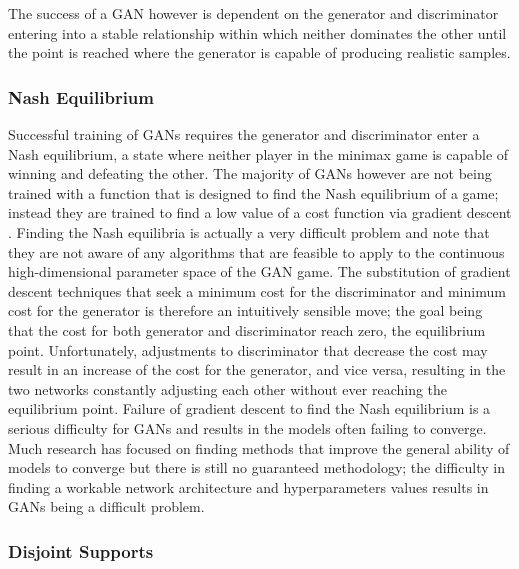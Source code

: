 \documentclass[a4paper, titlepage]{article}
\begin{document}
The success of a \ac{GAN} however is dependent on the generator and discriminator entering into a stable relationship within which neither dominates the other until the point is reached where the generator is capable of producing realistic samples.

\subsubsection{Nash Equilibrium}

Successful training of \ac{GAN}s requires the generator and discriminator enter a Nash equilibrium, a state where neither player in the minimax game is capable of winning and defeating the other.
The majority of \ac{GAN}s however are not being trained with a function that is designed to find the Nash equilibrium of a game; instead they are trained to find a low value of a cost function via gradient descent \citep{DBLP:journals/corr/SalimansGZCRC16}.
\newline
\newline
Finding the Nash equilibria is actually a very difficult problem and \citeauthor{DBLP:journals/corr/SalimansGZCRC16} note that they are not aware of any algorithms that are feasible to apply to the continuous high-dimensional parameter space of the \ac{GAN} game.
\newline
\newline
The substitution of gradient descent techniques that seek a minimum cost for the discriminator and minimum cost for the generator is therefore an intuitively sensible move; the goal being that the cost for both generator and discriminator reach zero, the equilibrium point.
Unfortunately, adjustments to discriminator that decrease the cost may result in an increase of the cost for the generator, and vice versa, resulting in the two networks constantly adjusting each other without ever reaching the equilibrium point.
\newline
\newline
Failure of gradient descent to find the Nash equilibrium is a serious difficulty for \ac{GAN}s and results in the models often failing to converge.
Much research has focused on finding methods that improve the general ability of models to converge but there is still no guaranteed methodology; the difficulty in finding a workable network architecture and hyperparameters values results in \ac{GAN}s being a difficult problem.

\subsubsection{Disjoint Supports}
\end{document}
